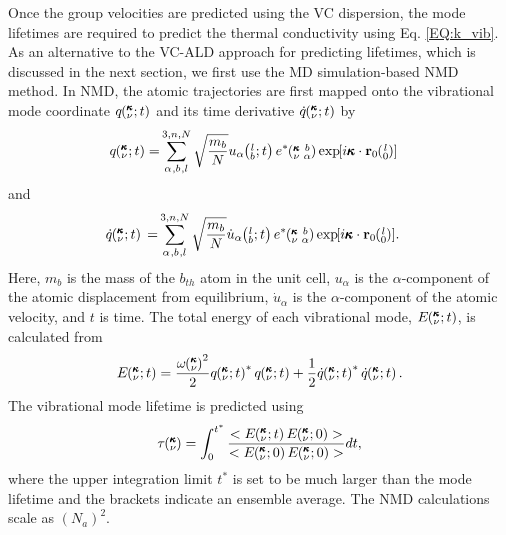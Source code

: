 Once the group velocities are predicted using the VC dispersion, 
the mode lifetimes are required to predict the thermal 
conductivity using Eq. \eqref{EQ:k_vib}. 
As an alternative to the VC-ALD approach for predicting lifetimes, 
which is discussed in the next section,  
we first use the MD simulation-based 
NMD method.\cite{ladd_lattice_1986,mcgaughey_quantitative_2004,
turney_predicting_2009-1,larkin_comparison_2012} In NMD, the 
atomic trajectories are first mapped onto the vibrational 
mode coordinate $q\mspace{-4.0mu}\left(\mspace{-8.0mu} \begin{smallmatrix}&\pmb{\kappa} \\&\nu\end{smallmatrix} \mspace{-2.0mu};t\right)$ and its time derivative $\dot{q}\mspace{-4.0mu}\left(\mspace{-8.0mu} \begin{smallmatrix}&\pmb{\kappa} \\&\nu\end{smallmatrix} \mspace{-2.0mu};t\right)$ by
\cite{dove_introduction_1993}
\begin{equation}\label{EQ:q}
\begin{split}
q\kvt=&\SUM{0}{}\sqrt{\frac{m_b}{N}}u_{\alpha}\lbt e^*\kvba
\EXP{i\pmb{\kappa}\cdot\mathbf{r}_0\ab{l}{0}}
\end{split}
\end{equation}
and
\begin{equation}\label{EQ:qdot}
\begin{split}
\dot{q}\kvt{}{}{}=&\SUM{0}{}\sqrt{\frac{m_b}{N}}\dot{u}_{\alpha}
\lbt e^*\kvba\EXP{i\pmb{\kappa}\cdot\mathbf{r}_0\ab{l}{0}}.
\end{split}
\end{equation}
Here, $m_b$ is the mass of the $b_{th}$ atom in the unit cell, 
$u_{\alpha}$ is the $\alpha$-component of the atomic displacement 
from equilibrium, $\dot{u}_{\alpha}$ is the $\alpha$-component 
of the atomic velocity, and $t$ is time.    
The total energy of each vibrational mode, $E\mspace{-4.0mu}\left(\mspace{-8.0mu} \begin{smallmatrix}&\pmb{\kappa} \\&\nu\end{smallmatrix} \mspace{-2.0mu};t\right)$, is calculated 
from 
\begin{equation}\label{A:E}
\begin{split}
E\kvt = \frac{\omega\kv^2}{2} q\kvt^*q\kvt + 
\frac{1}{2}\dot{q}\kvt^*\dot{q}\kvt.
\end{split}
\end{equation}
The vibrational mode lifetime is predicted using 
\begin{equation}\label{EQ:tau_nmd}
\tau\kv = \int_{0}^{t^*}
\frac{<E\kvt E\kvzero>}{ <E\kvzero E\kvzero> }dt,
\end{equation}
where the upper integration limit $t^*$ is set to be much larger 
than the mode lifetime and the brackets indicate 
an ensemble average.\cite{larkin_comparison_2012} 
The NMD calculations scale 
as $(N_a)^2$.\cite{turney_predicting_2009}  

